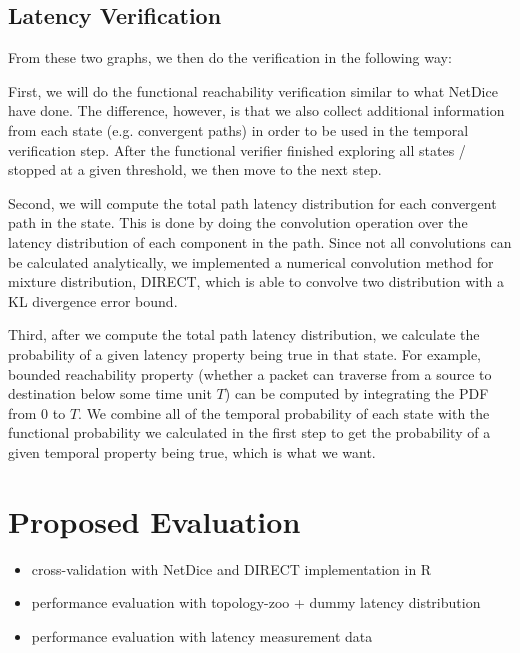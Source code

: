 \documentclass[10pt,sigconf,letterpaper,anonymous,nonacm]{acmart}
\begin{document}
\subsection{Latency Verification}
From these two graphs, we then do the verification in the following way:

First, we will do the functional reachability verification similar to what NetDice have done. 
The difference, however, is that we also collect additional information from each state (e.g. 
convergent paths) in order to be used in the temporal verification step. 
After the functional verifier finished exploring all states / stopped at a given threshold, we 
then move to the next step.

Second, we will compute the total path latency distribution for each convergent path in the state.
This is done by doing the convolution operation over the latency distribution of each component 
in the path. 
Since not all convolutions can be calculated analytically, we implemented a numerical convolution 
method for mixture distribution, DIRECT, which is able to convolve two distribution with a 
KL divergence error bound.

Third, after we compute the total path latency distribution, we calculate the probability of a 
given latency property being true in that state. For example, bounded reachability property 
(whether a packet can traverse from a source to destination below some time unit $T$) can be 
computed by integrating the PDF from $0$ to $T$. 
We combine all of the temporal probability of each state with the functional probability we 
calculated in the first step to get the probability of a given temporal property being true, 
which is what we want.

\section{Proposed Evaluation}
\begin{itemize}
    \item cross-validation with NetDice and DIRECT implementation in R
    \item performance evaluation with topology-zoo + dummy latency distribution
    \item performance evaluation with latency measurement data
\end{itemize}



\end{document}
